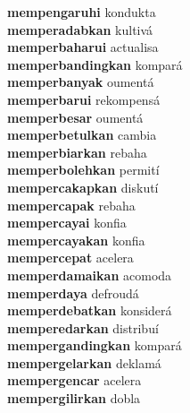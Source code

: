 \textbf{mempengaruhi } kondukta \\
\textbf{memperadabkan } kultivá \\
\textbf{memperbaharui } actualisa \\
\textbf{memperbandingkan } kompará \\
\textbf{memperbanyak } oumentá \\
\textbf{memperbarui } rekompensá \\
\textbf{memperbesar } oumentá \\
\textbf{memperbetulkan } cambia \\
\textbf{memperbiarkan } rebaha \\
\textbf{memperbolehkan } permití \\
\textbf{mempercakapkan } diskutí \\
\textbf{mempercapak } rebaha \\
\textbf{mempercayai } konfia \\
\textbf{mempercayakan } konfia \\
\textbf{mempercepat } acelera \\
\textbf{memperdamaikan } acomoda \\
\textbf{memperdaya } defroudá \\
\textbf{memperdebatkan } konsiderá \\
\textbf{memperedarkan } distribuí \\
\textbf{mempergandingkan } kompará \\
\textbf{mempergelarkan } deklamá \\
\textbf{mempergencar } acelera \\
\textbf{mempergilirkan } dobla \\
